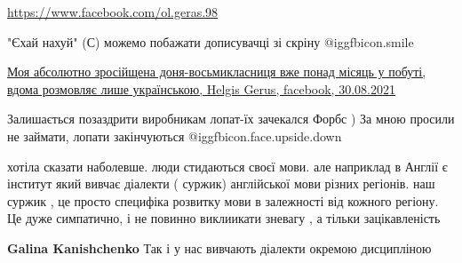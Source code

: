 \begin{itemize}
\url{https://www.facebook.com/ol.geras.98}\par
 
"Єхай нахуй" (С) можемо побажати дописувачці зі скріну  @igg{fbicon.smile} 

\href{https://www.facebook.com/ol.geras.98/posts/808711979809806}{%
Моя абсолютно зросійщена доня-восьмикласниця вже понад місяць у побуті, вдома розмовляє лише українською, %
Helgis Gerus, facebook, 30.08.2021%
}

 
Залишається позаздрити виробникам лопат-їх зачекался Форбс ) За мною просили не
займати, лопати закінчуються  @igg{fbicon.face.upside.down} 

 

хотіла сказати наболевше. люди стидаються своєї мови. але наприклад в Англії є
інститут який вивчає діалекти ( суржик) англійської мови різних регіонів. наш
суржик , це просто специфіка розвитку мови в залежності від кожного регіону. Це
дуже симпатично, і не повинно виклиикати зневагу , а тільки зацікавленість

\begin{itemize}
 
\textbf{Galina Kanishchenko} Так і у нас вивчають діалекти окремою дисципліною
\end{itemize}

 

\end{itemize}
